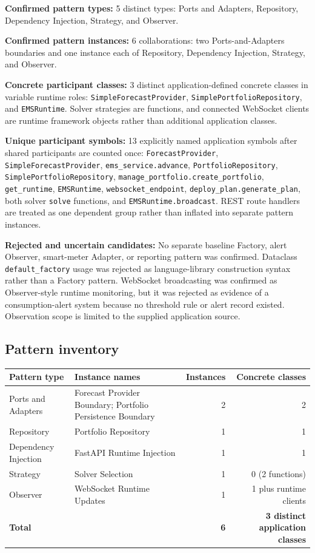 \documentclass[11pt,a4paper]{article}
\newcommand{\entry}[2]{\textbf{#1:} #2\par}
\newcommand{\codepath}[1]{\nolinkurl{#1}}
\begin{document}
\entry{Confirmed pattern types}{5 distinct types: Ports and Adapters, Repository, Dependency Injection, Strategy, and Observer.}
\entry{Confirmed pattern instances}{6 collaborations: two Ports-and-Adapters boundaries and one instance each of Repository, Dependency Injection, Strategy, and Observer.}
\entry{Concrete participant classes}{3 distinct application-defined concrete classes in variable runtime roles: \codepath{SimpleForecastProvider}, \codepath{SimplePortfolioRepository}, and \codepath{EMSRuntime}. Solver strategies are functions, and connected WebSocket clients are runtime framework objects rather than additional application classes.}
\entry{Unique participant symbols}{13 explicitly named application symbols after shared participants are counted once: \codepath{ForecastProvider}, \codepath{SimpleForecastProvider}, \codepath{ems_service.advance}, \codepath{PortfolioRepository}, \codepath{SimplePortfolioRepository}, \codepath{manage_portfolio.create_portfolio}, \codepath{get_runtime}, \codepath{EMSRuntime}, \codepath{websocket_endpoint}, \codepath{deploy_plan.generate_plan}, both solver \codepath{solve} functions, and \codepath{EMSRuntime.broadcast}. REST route handlers are treated as one dependent group rather than inflated into separate pattern instances.}
\entry{Rejected and uncertain candidates}{No separate baseline Factory, alert Observer, smart-meter Adapter, or reporting pattern was confirmed. Dataclass \codepath{default_factory} usage was rejected as language-library construction syntax rather than a Factory pattern. WebSocket broadcasting was confirmed as Observer-style runtime monitoring, but it was rejected as evidence of a consumption-alert system because no threshold rule or alert record existed. Observation scope is limited to the supplied application source.}

\subsection{Pattern inventory}

\begin{tabularx}{\linewidth}{@{}lXrr@{}}
\toprule
Pattern type & Instance names & Instances & Concrete classes\\
\midrule
Ports and Adapters & Forecast Provider Boundary; Portfolio Persistence Boundary & 2 & 2\\
Repository & Portfolio Repository & 1 & 1\\
Dependency Injection & FastAPI Runtime Injection & 1 & 1\\
Strategy & Solver Selection & 1 & 0 (2 functions)\\
Observer & WebSocket Runtime Updates & 1 & 1 plus runtime clients\\
\midrule
\textbf{Total} & & \textbf{6} & \textbf{3 distinct application classes}\\
\bottomrule
\end{tabularx}
\end{document}
